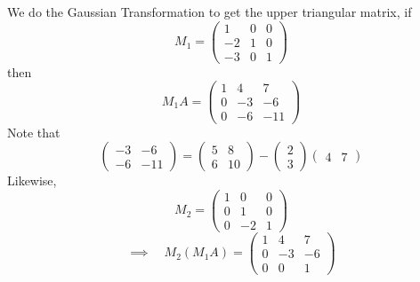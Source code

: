 We do the Gaussian Transformation to get the upper triangular matrix, if \[
    M_1 = \begin{pmatrix}
        1 & 0 & 0 \\
        -2 & 1 & 0 \\
        -3 & 0 & 1
    \end{pmatrix}
\] 
then \[
    M_1 A = \begin{pmatrix}
        1 & 4 & 7 \\
        0 & -3 & -6 \\
        0 & -6 & -11
    \end{pmatrix}
\]
Note that \[
    \begin{pmatrix}
        -3 & -6 \\
        -6 & -11
    \end{pmatrix} = \begin{pmatrix}
        5 & 8 \\
        6 & 10
    \end{pmatrix} - \begin{pmatrix}
        2 \\ 3
    \end{pmatrix} \begin{pmatrix}
        4 & 7
    \end{pmatrix}
\]
Likewise, \[
    M_2 = \begin{pmatrix}
        1 & 0 & 0 \\
        0 & 1 & 0 \\
        0 & -2 & 1
    \end{pmatrix}
\]
\[
    \implies \quad M_2 (M_1 A) = \begin{pmatrix}
        1 & 4 & 7 \\
        0 & -3 & -6 \\
        0 & 0 & 1
    \end{pmatrix}
\]


